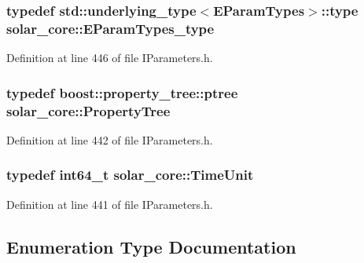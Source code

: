 \subsubsection[{E\+Param\+Types\+\_\+type}]{\setlength{\rightskip}{0pt plus 5cm}typedef std\+::underlying\+\_\+type$<${\bf E\+Param\+Types}$>$\+::type {\bf solar\+\_\+core\+::\+E\+Param\+Types\+\_\+type}}\label{namespacesolar__core_a256e8e2dc052f522b522d3f90b294caf}


Definition at line 446 of file I\+Parameters.\+h.

\hypertarget{namespacesolar__core_adeda2737d6938c190eb774a5b2495045}{}
\subsubsection[{Property\+Tree}]{\setlength{\rightskip}{0pt plus 5cm}typedef boost\+::property\+\_\+tree\+::ptree {\bf solar\+\_\+core\+::\+Property\+Tree}}\label{namespacesolar__core_adeda2737d6938c190eb774a5b2495045}


Definition at line 442 of file I\+Parameters.\+h.

\hypertarget{namespacesolar__core_a4b5949d07259da6f8a20d12a30403e90}{}
\subsubsection[{Time\+Unit}]{\setlength{\rightskip}{0pt plus 5cm}typedef int64\+\_\+t {\bf solar\+\_\+core\+::\+Time\+Unit}}\label{namespacesolar__core_a4b5949d07259da6f8a20d12a30403e90}


Definition at line 441 of file I\+Parameters.\+h.



\subsection{Enumeration Type Documentation}
\hypertarget{namespacesolar__core_ac827fdef4412a3c0d5e44d3f31908e49}{}
